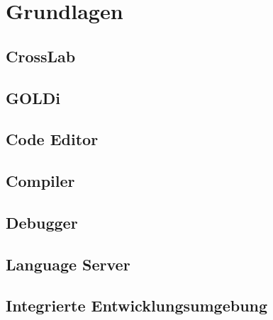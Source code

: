 \chapter{Grundlagen}\label{section:grundlagen}

\section{CrossLab}\label{section:grundlagen:crosslab}

\section{GOLDi}\label{section:grundlagen:goldi}

\section{Code Editor}\label{section:grundlagen:code-editor}

\section{Compiler}\label{section:grundlagen:compiler}

\section{Debugger}\label{section:grundlagen:debugger}

\section{Language Server}\label{section:grundlagen:language-server}

\section{Integrierte Entwicklungsumgebung}\label{section:grundlagen:integrierte-entwicklungsumgebung}